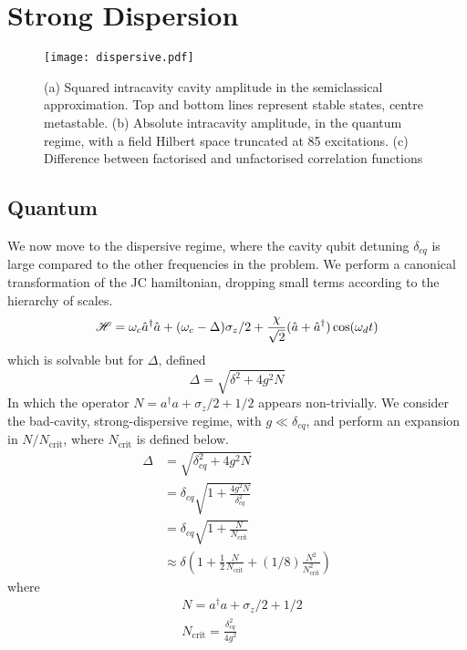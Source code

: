 \section{Strong Dispersion}
\begin{figure*}[ht]
    \label{dispersive}
    \texttt{[image: dispersive.pdf]}
    \caption{(a) Squared intracavity cavity amplitude in the semiclassical approximation. Top and bottom lines represent stable states, centre metastable. (b) Absolute intracavity amplitude, in the quantum regime, with a field Hilbert space truncated at 85 excitations. (c) Difference between factorised and unfactorised correlation functions}
\end{figure*}
\subsection{Quantum}
We now move to the dispersive regime, where the cavity qubit detuning $\delta_{cq}$ is large compared to the other frequencies in the problem. 
We perform a canonical transformation \cite{Carbonaro1979} of the JC hamiltonian, dropping small terms according to the hierarchy of scales.
\begin{equation}
\mathscr{H} = \omega_c \hat{a}^\dagger \hat{a} + ( \omega_c - \Delta ) \sigma_z /2 + \frac{\chi}{\sqrt{2}} (\hat{a} + \hat{a}^\dagger ) \cos(\omega_d t)
\end{equation}
which is solvable but for $\Delta$, defined
\begin{equation}
        \Delta = \sqrt{\delta^2 +4 g ^2 N}
\end{equation}
In which the operator $N = a ^ \dagger a + \sigma_z/2 + 1/2$ appears non-trivially. 
We consider the bad-cavity, strong-dispersive regime, with $g\ll\delta_{cq}$, and perform an expansion in $N/N_{\text{crit}}$, where $N_{\text{crit}}$ is defined below.
\begin{align}
    \Delta &= \sqrt{\delta_{cq}^2 + 4g^2 N}\\
           &= \delta_{cq} \sqrt{1 + \frac{4g^2N}{\delta_{cq}^2}}\\
           &= \delta_{cq} \sqrt{1 + \frac{N}{N_{\text{crit}}}}\\
           & \approx \delta \left(
             1
             + \frac{1}{2}\frac{N}{N_{\text{crit}}}
             + (1/8) \frac{N^2}{N^2_{\text{crit}}}
             \right)
\end{align}
where 
\begin{align}
    &N = a ^ \dagger a + \sigma_z/2 + 1/2\\
    &N_{\text{crit}} = \frac{\delta_{cq}^2}{4g^2}
\end{align}
